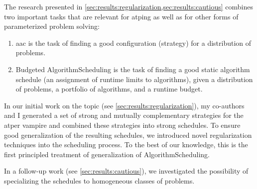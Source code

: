 The research presented in \cref{sec:results:regularization,sec:results:cautious} combines two important tasks
that are relevant for \gls{atping} as well as for other forms of parameterized problem solving:
\begin{enumerate}
\item \Gls{aac} \cite{DBLP:journals/jair/SchedeBTWBHT22} is the task of finding a good configuration (strategy) for a distribution of problems.
\item Budgeted \gls{AlgorithmScheduling} \cite{DBLP:journals/ec/KerschkeHNT19} is the task of finding a good static algorithm schedule (an assignment of runtime limits to algorithms), given a distribution of problems, a portfolio of algorithms, and a runtime budget.
\end{enumerate}

In our initial work on the topic \cite{DBLP:conf/ijcar/BartekCS24} (see \cref{sec:results:regularization}),
my co-authors and I generated a set of strong and mutually complementary strategies for the \gls{atper} \gls{vampire}
and combined these strategies into strong schedules.
To ensure good generalization of the resulting schedules,
we introduced novel regularization techniques into the scheduling process.
To the best of our knowledge, this is the first principled treatment of generalization of \gls{AlgorithmScheduling}.

In a follow-up work \cite{DBLP:conf/paar/BartekC024} (see \cref{sec:results:cautious}), we investigated the possibility of specializing the schedules to homogeneous classes of problems.

